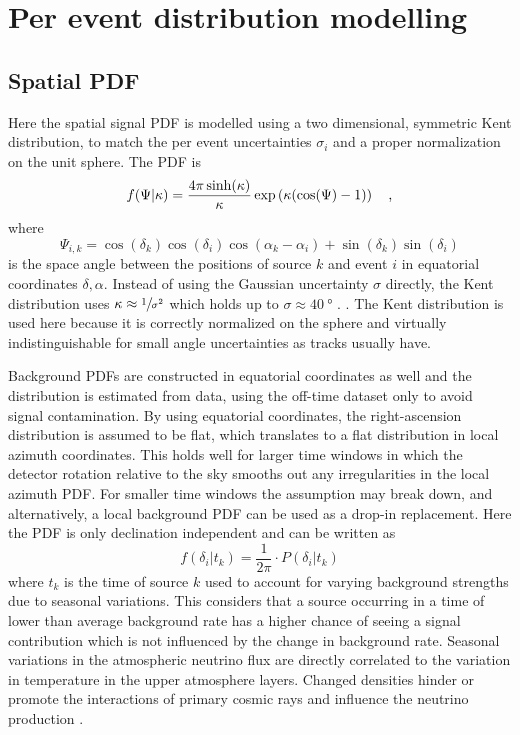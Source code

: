 \section{Per event distribution modelling}
\subsection*{Spatial PDF}
Here the spatial signal PDF is modelled using a two dimensional, symmetric Kent distribution, to match the per event uncertainties $\sigma_i$ and a proper normalization on the unit sphere.
The PDF is
\begin{equation}
  f(\Psi|\kappa)
  = \frac{4\pi \sinh(\kappa)}{\kappa}\exp\left(\kappa(\cos(\Psi)-1)\right)
  \quad\text{,}
\end{equation}
where
\begin{equation}
  \Psi_{i,k}
  = \cos(\delta_k)\cos(\delta_i)\cos(\alpha_k - \alpha_i) +
    \sin(\delta_k)\sin(\delta_i)
\end{equation}
is the space angle between the positions of source $k$ and event $i$ in equatorial coordinates $\delta, \alpha$.
Instead of using the Gaussian uncertainty $\sigma$ directly, the Kent distribution uses $\kappa \approx \sfrac{1}{\sigma^2}$ which holds up to $\sigma \approx \SI{40}{\degree}$ \cite{Yasutomi:2014kent,Jakob:2012kent}.
.
The Kent distribution is used here because it is correctly normalized on the sphere and virtually indistinguishable for small angle uncertainties as tracks usually have.

Background PDFs are constructed in equatorial coordinates as well and the distribution is estimated from data, using the off-time dataset only to avoid signal contamination.
By using equatorial coordinates, the right-ascension distribution is assumed to be flat, which translates to a flat distribution in local azimuth coordinates.
This holds well for larger time windows in which the detector rotation relative to the sky smooths out any irregularities in the local azimuth PDF.
For smaller time windows the assumption may break down, and alternatively, a local background PDF can be used as a drop-in replacement.
Here the PDF is only declination independent and can be written as
\begin{equation}
  f(\delta_i|t_k) = \frac{1}{2\pi}\cdot P(\delta_i|t_k)
\end{equation}
where $t_k$ is the time of source $k$ used to account for varying background strengths due to seasonal variations.
This considers that a source occurring in a time of lower than average background rate has a higher chance of seeing a signal contribution which is not influenced by the change in background rate.
Seasonal variations in the atmospheric neutrino flux are directly correlated to the variation in temperature in the upper atmosphere layers.
Changed densities hinder or promote the interactions of primary cosmic rays and influence the neutrino production \cite{Barret:1952seasons,Gaisser:2010seasons,Gaisser:2013icrc}.


